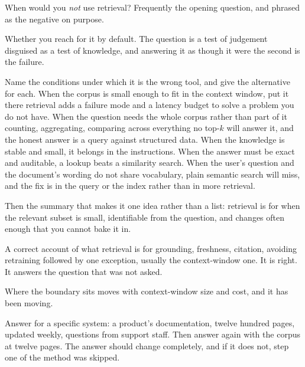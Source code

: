 \begin{bankq}{When would you \emph{not} use retrieval?}
\qasked
Frequently the opening question, and phrased as the negative on purpose.

\qtested
Whether you reach for it by default. The question is a test of judgement
disguised as a test of knowledge, and answering it as though it were the
second is the failure.

\qstaff
Name the conditions under which it is the wrong tool, and give the alternative
for each. When the corpus is small enough to fit in the context window, put it
there \dash{} retrieval adds a failure mode and a latency budget to solve a
problem you do not have. When the question needs the whole corpus rather than
part of it \dash{} counting, aggregating, comparing across everything \dash{} no
top-$k$ will answer it, and the honest answer is a query against structured
data. When the knowledge is stable and small, it belongs in the instructions.
When the answer must be exact and auditable, a lookup beats a similarity
search. When the user's question and the document's wording do not share
vocabulary, plain semantic search will miss, and the fix is in the query or the
index rather than in more retrieval.

Then the summary that makes it one idea rather than a list: retrieval is for
when the relevant subset is small, identifiable from the question, and changes
often enough that you cannot bake it in.

\qsenior
A correct account of what retrieval is for \dash{} grounding, freshness,
citation, avoiding retraining \dash{} followed by one exception, usually the
context-window one. It is right. It answers the question that was not asked.

\qcontested
Where the boundary sits moves with context-window size and cost, and it has
been moving. 

\qdrill
Answer for a specific system: a product's documentation, twelve hundred pages,
updated weekly, questions from support staff. Then answer again with the corpus
at twelve pages. The answer should change completely, and if it does not, step
one of the method was skipped.
\end{bankq}


